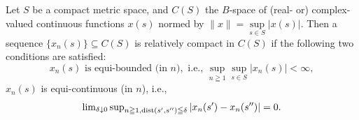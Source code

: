 \begin{theoremn} Let $S$ be a compact metric space, and $C(S)$ the $B$-space of (real- or) complex-valued continuous functions $x(s)$ normed by $\|x\| = \sup\limits_{s \in S} |x(s)|$. Then a sequence $\{x_n(s)\} \subseteq C(S)$ is relatively compact in $C(S)$ if the following two conditions are satisfied:
\begin{equation}\label{eq:III.3.1}
x _{n} (s) \text{ is equi-bounded (in } n), \text{ i.e., } \sup\limits _{n \geqq 1} \sup\limits _{s \in S} | x _{n} (s) | < \infty ,
\end{equation}
$x_{n}(s)$ is equi-continuous (in $n$), i.e., 
\begin{equation}\label{eq:III.3.2}
\lim\nolimits _{\delta \downarrow 0} \sup\nolimits _ {n \geqq 1, \operatorname{dist} (s ^{\prime}, s ^{\prime \prime}) \leqq \delta} | x _{n} (s ^{\prime}) - x _{n} (s ^{\prime \prime}) | = 0.
\end{equation}

\end{theoremn}

